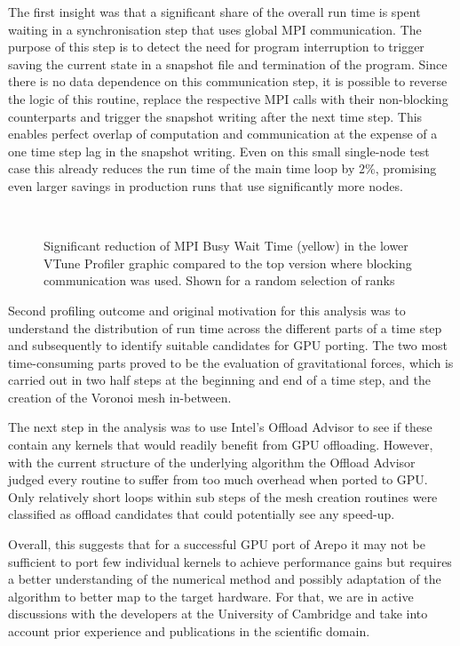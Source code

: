 \documentclass[../main]{subfiles}
\begin{document}
The first insight was that a significant share of the overall run time is spent waiting in a synchronisation step that uses global MPI communication.
The purpose of this step is to detect the need for program interruption to trigger saving the current state in a snapshot file and termination of the program.
Since there is no data dependence on this communication step, it is possible to reverse the logic of this routine, replace the respective MPI calls with their non-blocking counterparts and trigger the snapshot writing after the next time step.
This enables perfect overlap of computation and communication at the expense of a one time step lag in the snapshot writing.
Even on this small single-node test case this already reduces the run time of the main time loop by 2\%, promising even larger savings in production runs that use significantly more nodes.

\begin{figure}[htp]
	\centering
	\\
	\caption{Significant reduction of MPI Busy Wait Time (yellow) in the lower VTune Profiler graphic compared to the top version where blocking communication was used. Shown for a random selection of ranks}
	\label{fig:arepo_mpicom} %
\end{figure}

Second profiling outcome and original motivation for this analysis was to understand the distribution of run time across the different parts of a time step and subsequently to identify suitable candidates for GPU porting.
The two most time-consuming parts proved to be the evaluation of gravitational forces, which is carried out in two half steps at the beginning and end of a time step, and the creation of the Voronoi mesh in-between.

The next step in the analysis was to use Intel's Offload Advisor to see if these contain any kernels that would readily benefit from GPU offloading.
However, with the current structure of the underlying algorithm the Offload Advisor judged every routine to suffer from too much overhead when ported to GPU.
Only relatively short loops within sub steps of the mesh creation routines were classified as offload candidates that could potentially see any speed-up.

Overall, this suggests that for a successful GPU port of Arepo it may not be sufficient to port few individual kernels to achieve performance gains but requires a better understanding of the numerical method and possibly adaptation of the algorithm to better map to the target hardware.
For that, we are in active discussions with the developers at the University of Cambridge and take into account prior experience and publications in the scientific domain.

\end{document}
